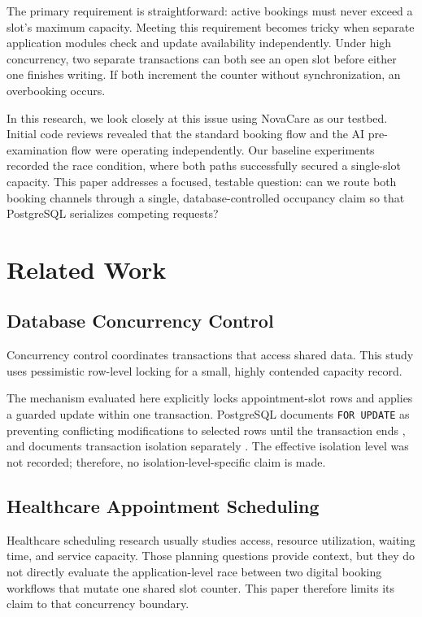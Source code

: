 \documentclass[conference]{IEEEtran}
\begin{document}
The primary requirement is straightforward: active bookings must never exceed a slot's maximum capacity. Meeting this requirement becomes tricky when separate application modules check and update availability independently. Under high concurrency, two separate transactions can both see an open slot before either one finishes writing. If both increment the counter without synchronization, an overbooking occurs.

In this research, we look closely at this issue using NovaCare as our testbed. Initial code reviews revealed that the standard booking flow and the AI pre-examination flow were operating independently. Our baseline experiments recorded the race condition, where both paths successfully secured a single-slot capacity. This paper addresses a focused, testable question: can we route both booking channels through a single, database-controlled occupancy claim so that PostgreSQL serializes competing requests?

\section{Related Work}
\subsection{Database Concurrency Control}
Concurrency control coordinates transactions that access shared data. This study uses pessimistic row-level locking for a small, highly contended capacity record.

The mechanism evaluated here explicitly locks appointment-slot rows and applies a guarded update within one transaction. PostgreSQL documents \texttt{FOR UPDATE} as preventing conflicting modifications to selected rows until the transaction ends \cite{postgreslocking}, and documents transaction isolation separately \cite{postgresisolation}. The effective isolation level was not recorded; therefore, no isolation-level-specific claim is made.

\subsection{Healthcare Appointment Scheduling}
Healthcare scheduling research usually studies access, resource utilization, waiting time, and service capacity. Those planning questions provide context, but they do not directly evaluate the application-level race between two digital booking workflows that mutate one shared slot counter. This paper therefore limits its claim to that concurrency boundary.
\end{document}
